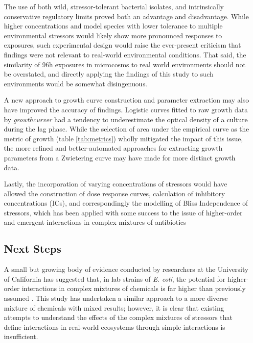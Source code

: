 \documentclass[10pt]{article}
\begin{document}
The use of both wild, stressor-tolerant bacterial isolates, and intrinsically conservative regulatory limits proved both an advantage and disadvantage. While higher concentrations and model species with lower tolerance to multiple environmental stressors would likely show more pronounced responses to exposures, such experimental design would raise the ever-present criticism that findings were not relevant to real-world environmental conditions. That said, the similarity of 96h exposures in microcosms to real world environments should not be overstated, and directly applying the findings of this study to such environments would be somewhat disingenuous. 

A new approach to growth curve construction and parameter extraction may also have improved the accuracy of findings. Logistic curves fitted to raw growth data by \textit{growthcurver} had a tendency to underestimate the optical density of a culture during the lag phase. While the selection of area under the empirical curve as the metric of growth (table \ref{tab:metrics}) wholly mitigated the impact of this issue, the more refined and better-automated approaches for extracting growth parameters from a Zwietering curve \cite{Cuevas2017,Cuevas2018} may have made for more distinct growth data.

Lastly, the incorporation of varying concentrations of stressors would have allowed the construction of dose response curves, calculation of inhibitory concentrations (ICs), and correspondingly the modelling of Bliss Independence \cite{Bliss1939} of stressors, which has been applied with some success to the issue of higher-order and emergent interactions in complex mixtures of antibiotics \cite{Beppler2016,Tekin2017a} 

\subsection{Next Steps}
\label{S:4:4}

A small but growing body of evidence conducted by researchers at the University of California has suggested that, in lab strains of \textit{E. coli}, the potential for higher-order interactions in complex mixtures of chemicals is far higher than previously assumed \cite{Beppler2016,Tekin2016,Tekin2017a}.  This study has undertaken a similar approach to a more diverse mixture of chemicals with mixed results; however, it is clear that existing attempts to understand the effects of the complex mixtures of stressors that define interactions in real-world ecosystems through simple interactions is insufficient.
\end{document}
